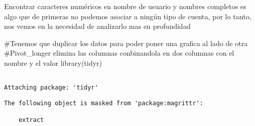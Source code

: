 \documentclass[
  letterpaper,
  DIV=11,
  numbers=noendperiod]{scrreprt}
\newenvironment{Shaded}{\begin{snugshade}}{\end{snugshade}}
\newcommand{\CommentTok}[1]{\textcolor[rgb]{0.37,0.37,0.37}{#1}}
\newcommand{\FunctionTok}[1]{\textcolor[rgb]{0.28,0.35,0.67}{#1}}
\newcommand{\NormalTok}[1]{\textcolor[rgb]{0.00,0.23,0.31}{#1}}
\begin{document}
Encontrar caracteres numéricos en nombre de usuario y nombres completos
es algo que de primeras no podemos asociar a ningún tipo de cuenta, por
lo tanto, nos vemos en la necesidad de analizarlo mas en profundidad

\begin{Shaded}
\begin{Highlighting}[]
\CommentTok{\#Tenemos que duplicar los datos para poder poner una grafica al lado de otra}
\CommentTok{\#Pivot\_longer elimina las columnas conbinandola en dos columnas con el nombre y el valor}
\FunctionTok{library}\NormalTok{(tidyr)}
\end{Highlighting}
\end{Shaded}

\begin{verbatim}

Attaching package: 'tidyr'
\end{verbatim}

\begin{verbatim}
The following object is masked from 'package:magrittr':

    extract
\end{verbatim}
\end{document}
